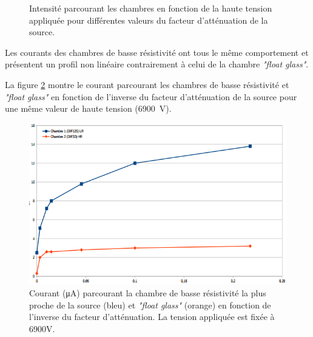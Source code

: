 \begin{figure}[ht!]
	\centering
	\hfill
	\caption{Intensité parcourant les chambres en fonction de la haute tension appliquée pour différentes valeurs du facteur d'atténuation de la source.}
	\label{courant}
\end{figure}

Les courants des chambres de basse résistivité ont tous le même comportement et présentent un profil non linéaire contrairement à celui de la chambre \textit{"float glass"}.

La figure \ref{currentsamHV} montre le courant parcourant les chambres de basse résistivité et \textit{"float glass"} en fonction de l'inverse du facteur d'atténuation de la source pour une même valeur de haute tension (\SI{6900}{\volt}).

\begin{figure}[ht!]
	\centering
	\includegraphics[width=.75\linewidth]{GLA/current_same_HV.png}
	\caption{Courant (\si{\micro\ampere}) parcourant la chambre de basse résistivité la plus proche de la source (bleu) et \textit{"float glass"} (orange) en fonction de l'inverse du facteur d'atténuation. La tension appliquée est fixée à 6900V.}
	\label{currentsamHV}
\end{figure}

